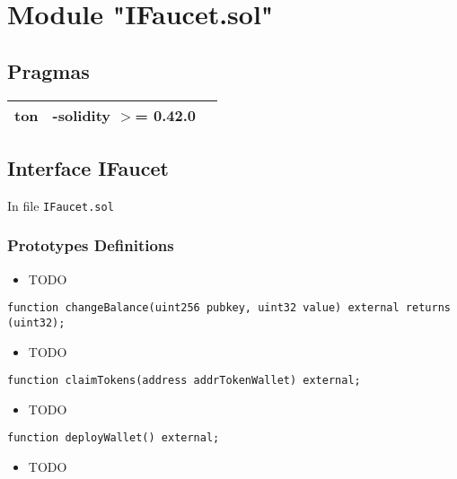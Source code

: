 
\section{Module "IFaucet.sol"}


\subsection{Pragmas}


\noindent\begin{tabular}{|l|l|p{5cm}|}\hline
ton & -solidity $>$= 0.42.0 &\\\hline
\end{tabular}


\subsection{Interface IFaucet}

\minitoc

In file {\tt IFaucet.sol}

\subsubsection{Prototypes Definitions}

\begin{itemize}
\item TODO
\end{itemize}

\begin{lstlisting}[firstnumber=6]
    function changeBalance(uint256 pubkey, uint32 value) external returns (uint32);
\end{lstlisting}
\begin{itemize}
\item TODO
\end{itemize}

\begin{lstlisting}[firstnumber=4]
    function claimTokens(address addrTokenWallet) external;
\end{lstlisting}
\begin{itemize}
\item TODO
\end{itemize}

\begin{lstlisting}[firstnumber=7]
    function deployWallet() external;
\end{lstlisting}
\begin{itemize}
\item TODO
\end{itemize}

